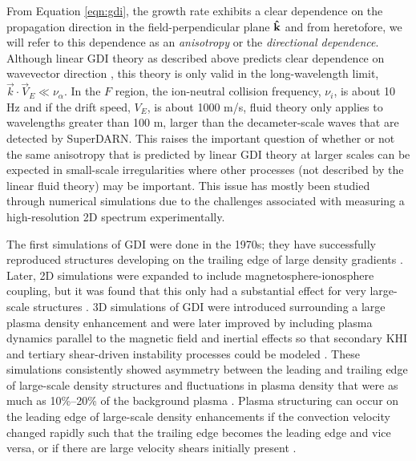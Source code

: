 From Equation \ref{eqn:gdi}, the growth rate exhibits a clear dependence on the propagation direction in the field-perpendicular plane \(\mathbf{\hat{k}}\) and from heretofore, we will refer to this dependence as an \textit{anisotropy}  or the \textit{directional dependence}.  Although linear GDI theory as described above predicts clear dependence on wavevector direction \citep{Makarevich2014c}, this theory is only valid in the long-wavelength limit, \(\vec{k}\cdot\vec{V}_E \ll \nu_\alpha\).  In the \(F\) region, the ion-neutral collision frequency, \(\nu_i\), is about 10 Hz and if the drift speed, \(V_E\), is about 1000 m/s, fluid theory only applies to wavelengths greater than 100 m, larger than the decameter-scale waves that are detected by SuperDARN.  This raises the important question of whether or not the same anisotropy that is predicted by linear GDI theory at larger scales can be expected in small-scale irregularities where other processes (not described by the linear fluid theory) may be important.  This issue has mostly been studied through numerical simulations due to the challenges associated with measuring a high-resolution 2D spectrum experimentally.

The first simulations of GDI were done in the 1970s; they have successfully reproduced structures developing on the trailing edge of large density gradients \citep{Zabusky1973,Doles1976,Scannapieco1976,Ossakow1975,Ossakow1977}.  Later, 2D simulations were expanded to include magnetosphere-ionosphere coupling, but it was found that this only had a substantial effect for very large-scale structures \citep{Keskinen1990}.  3D simulations of GDI were introduced surrounding a large plasma density enhancement \citep{Guzdar1998} and were later improved by including plasma dynamics parallel to the magnetic field and inertial effects so that secondary KHI and tertiary shear-driven instability processes could be modeled \citep{Gondarenko1999}.  These simulations consistently showed asymmetry between the leading and trailing edge of large-scale density structures and fluctuations in plasma density that were as much as 10\%--20\% of the background plasma \citep{Gondarenko2004a,Gondarenko2004b}.  Plasma structuring can occur on the leading edge of large-scale density enhancements if the convection velocity changed rapidly such that the trailing edge becomes the leading edge and vice versa, or if there are large velocity shears initially present \citep{Gondarenko2004a,Gondarenko2004b}.

